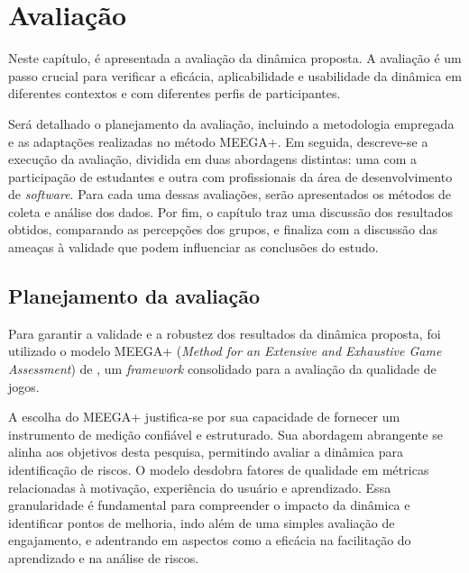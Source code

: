 \documentclass[
	12pt,
	openright,
	twoside,
	a4paper,
	english,
	brazil
	]{abntex2}
\begin{document}


\chapter{Avaliação}
\label{cap:avaliacao}

Neste capítulo, é apresentada a avaliação da dinâmica proposta. A avaliação é um passo crucial para verificar a eficácia, aplicabilidade e usabilidade da dinâmica em diferentes contextos e com diferentes perfis de participantes.

Será detalhado o planejamento da avaliação, incluindo a metodologia empregada e as adaptações realizadas no método MEEGA+. Em seguida, descreve-se a execução da avaliação, dividida em duas abordagens distintas: uma com a participação de estudantes e outra com profissionais da área de desenvolvimento de \textit{software}. Para cada uma dessas avaliações, serão apresentados os métodos de coleta e análise dos dados. Por fim, o capítulo traz uma discussão dos resultados obtidos, comparando as percepções dos grupos, e finaliza com a discussão das ameaças à validade que podem influenciar as conclusões do estudo.

\section{Planejamento da avaliação}

Para garantir a validade e a robustez dos resultados da dinâmica proposta, foi utilizado o modelo MEEGA+ (\textit{Method for an Extensive and Exhaustive Game Assessment}) de , um \textit{framework} consolidado para a avaliação da qualidade de jogos.

A escolha do MEEGA+ justifica-se por sua capacidade de fornecer um instrumento de medição confiável e estruturado. Sua abordagem abrangente se alinha aos objetivos desta pesquisa, permitindo avaliar a dinâmica para identificação de riscos. O modelo desdobra fatores de qualidade em métricas relacionadas à motivação, experiência do usuário e aprendizado. Essa granularidade é fundamental para compreender o impacto da dinâmica e identificar pontos de melhoria, indo além de uma simples avaliação de engajamento, e adentrando em aspectos como a eficácia na facilitação do aprendizado e na análise de riscos.
\end{document}
